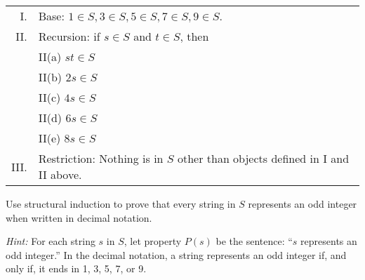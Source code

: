 \documentclass[14pt]{extarticle}
\begin{document}
\begin{tabular}{rl}
    I.   & Base: $1 \in S, 3 \in S, 5 \in S, 7 \in S, 9 \in S$.                         \\
    II.  & Recursion: if $s \in S$ and $t \in S$, then                                  \\
         & II(a) $st \in S$                                                             \\
         & II(b) $2s \in S$                                                             \\
         & II(c) $4s \in S$                                                             \\
         & II(d) $6s \in S$                                                             \\
         & II(e) $8s \in S$                                                             \\
    III. & Restriction: Nothing is in $S$ other than objects defined in I and II above.
\end{tabular}

Use structural induction to prove that every string in $S$ represents an odd integer when written in decimal notation.

    {\it Hint:} For each string $s$ in $S$, let property $P(s)$ be the sentence: “$s$ represents an odd integer.” In the
decimal notation, a string represents an odd integer if, and only if, it ends in 1, 3, 5, 7, or 9.
\end{document}
